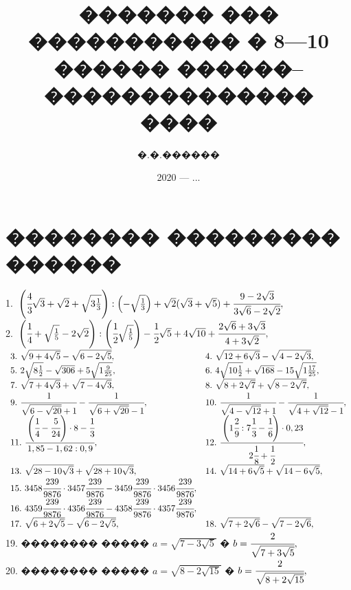 \documentclass[12pt]{article}
\author{�.�.������}
\title{������� ��� ����������� � 8---10 ������ ������--�������������� ����}
\date{2020 --- ...}
\begin{document}
\maketitle
\newpage
\tableofcontents
\newpage
\section{�������� ��������� ������}
1.\ $\left(\cfrac{4}{3}\sqrt{3}+\sqrt{2}+\sqrt{3\frac{1}{3}}\right): \left(-\sqrt{\frac{1}{3}}\right)+\sqrt{2}(\sqrt{3}+\sqrt{5})+\cfrac{9-2\sqrt{3}}{3\sqrt{6}-2\sqrt{2}},$\\
2.\ $\left(\cfrac{1}{4}+\sqrt{\frac{1}{5}}-2\sqrt{2}\right): \left(\cfrac{1}{2}\sqrt{\frac{1}{5}}\right)-\cfrac{1}{2}\sqrt{5}+4\sqrt{10}+\cfrac{2\sqrt{6}+3\sqrt{3}}{4+3\sqrt{2}},$\\
$\begin{array}{ll}
3.\ \sqrt{9+4\sqrt{5}}-\sqrt{6-2\sqrt{5}},&
4.\ \sqrt{12+6\sqrt{3}}-\sqrt{4-2\sqrt{3}},\\
5.\ 2\sqrt{8\frac{1}{2}}-\sqrt{306}+5\sqrt{1\frac{9}{25}},&
6.\ 4\sqrt{10\frac{1}{2}}+\sqrt{168}-15\sqrt{1\frac{17}{25}},\\
7.\ \sqrt{7+4\sqrt{3}}+\sqrt{7-4\sqrt{3}},&
8.\ \sqrt{8+2\sqrt{7}}+\sqrt{8-2\sqrt{7}},\\
9.\ \cfrac{1}{\sqrt{6-\sqrt{20}}+1}-\cfrac{1}{\sqrt{6+\sqrt{20}}-1},&
10.\ \cfrac{1}{\sqrt{4-\sqrt{12}}+1}-\cfrac{1}{\sqrt{4+\sqrt{12}}-1},\\
11.\ \cfrac{\left(\cfrac{1}{4}-\cfrac{5}{24}\right)\cdot 8-\cfrac{1}{3}}{1,85-1,62:0,9},&
12.\ \cfrac{\left(1\cfrac{2}{9}:7\cfrac{1}{3}-\cfrac{1}{6}\right)\cdot0,23}{2\cfrac{1}{8}+\cfrac{1}{2}},\\
13.\ \sqrt{28-10\sqrt{3}}+\sqrt{28+10\sqrt{3}},&
14.\ \sqrt{14+6\sqrt{5}}+\sqrt{14-6\sqrt{5}},\\
15.\ 3458\cfrac{239}{9876}\cdot3457\cfrac{239}{9876}-3459\cfrac{239}{9876}\cdot3456\cfrac{239}{9876},\\
16.\ 4359\cfrac{239}{9876}\cdot4356\cfrac{239}{9876}-4358\cfrac{239}{9876}\cdot4357\cfrac{239}{9876},\\
17.\ \sqrt{6+2\sqrt{5}}-\sqrt{6-2\sqrt{5}},&
18.\ \sqrt{7+2\sqrt{6}}-\sqrt{7-2\sqrt{6}},\\
\end{array}$\\
19. �������� ����� $a=\sqrt{7-3\sqrt{5}}$ � $b=\cfrac{2}{\sqrt{7+3\sqrt{5}}},$\\
20. �������� ����� $a=\sqrt{8-2\sqrt{15}}$ � $b=\cfrac{2}{\sqrt{8+2\sqrt{15}}},$\\
\end{document}
